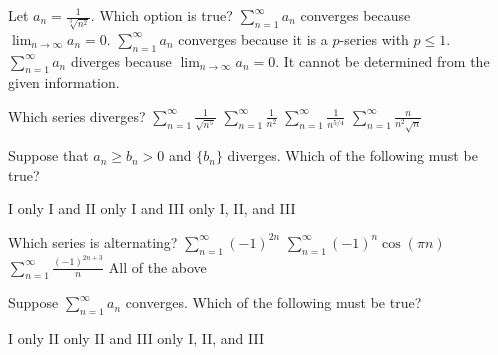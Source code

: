 \begin{question}
Let \(a_n = \frac{1}{\sqrt[3]{n^2}}.\) Which option is true? 
\choices
{\(\sum_{n = 1}^\infty a_n\) converges because \(\lim_{n \to \infty} a_n = 0.\)}
{\(\sum_{n = 1}^\infty a_n\) converges because it is a \(p\)-series with \(p \leqslant 1.\)}
{\(\sum_{n = 1}^\infty a_n\) diverges because \(\lim_{n \to \infty} a_n = 0.\)}
{}
{It cannot be determined from the given information.}
\end{question}

\begin{question}
Which series diverges?
\choicesline
{\(\sum_{n = 1}^\infty \frac{1}{\sqrt{n^5}}\)}
{\(\sum_{n = 1}^\infty \frac{1}{n^2}\)}
{}
{\(\sum_{n = 1}^\infty \frac{1}{n^{5/4}}\)}
{\(\sum_{n = 1}^\infty \frac{n}{n^2 \sqrt n}\)}
\end{question}

\begin{question}
Suppose that \(a_n \geqslant b_n > 0\) and \(\{b_n\}\) diverges. Which of the following must be true?


\choices
{}
{I only}
{I and II only}
{I and III only}
{I, II, and III}
\end{question}

\begin{question}
Which series is alternating?
\choices
{\(\sum_{n = 1}^\infty (-1)^{2n}\)}
{\(\sum_{n = 1}^\infty (-1)^n \cos(\pi n)\)}
{\(\sum_{n = 1}^\infty \frac{(-1)^{2n + 3}}{n}\)}
{}
{All of the above}
\end{question}

\begin{question}
Suppose \(\sum_{n = 1}^\infty a_n\) converges. Which of the following must be true?


\choices
{I only}
{II only}
{}
{II and III only}
{I, II, and III}
\end{question}


